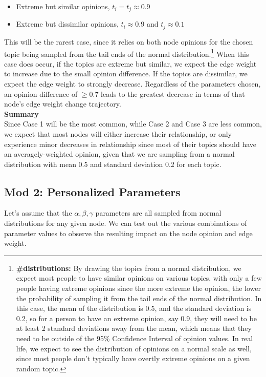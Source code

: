 \documentclass[11pt]{article}
\providecommand{\tightlist}{%
      \setlength{\itemsep}{0pt}\setlength{\parskip}{0pt}}
\begin{document}
\begin{itemize}
\tightlist
\item
  Extreme but similar opinions, \(t_{i} = t_{j} \approx 0.9\)
\item
  Extreme but dissimilar opinions, \(t_{i} \approx 0.9\) and
  \(t_{j} \approx 0.1\)
\end{itemize}

This will be the rarest case, since it relies on both node opinions for
the chosen topic being sampled from the tail ends of the normal
distribution.\footnote{\textbf{\#distributions:} By drawing the topics from a normal distribution, we expect most people to have similar opinions on various topics, with only a few people having extreme opinions since the more extreme the opinion, the lower the probability of sampling it from the tail ends of the normal distribution. In this case, the mean of the distribution is 0.5, and the standard deviation is 0.2, so for a person to have an extreme opinion, say 0.9, they will need to be at least 2 standard deviations away from the mean, which means that they need to be outside of the 95\% Confidence Interval of opinion values. In real life, we expect to see the distribution of opinions on a normal scale as well, since most people don't typically have overtly extreme opinions on a given random topic.} When this case does occur, if the topics are extreme but
similar, we expect the edge weight to increase due to the small opinion
difference. If the topics are dissimilar, we expect the edge weight to
strongly decrease. Regardless of the parameters chosen, an opinion
difference of \(\geq 0.7\) leads to the greatest decrease in terms of
that node's edge weight change trajectory.\\

\textbf{Summary}\\

Since Case 1 will be the most common, while Case 2 and Case 3 are less
common, we expect that most nodes will either increase their
relationship, or only experience minor decreases in relationship since
most of their topics should have an averagely-weighted opinion, given
that we are sampling from a normal distribution with mean 0.5 and
standard deviation 0.2 for each topic.

    \subsection{Mod 2: Personalized Parameters}

Let's assume that the \(\alpha, \beta,\gamma\) parameters are all
sampled from normal distributions for any given node. We can test out
the various combinations of parameter values to observe the resulting
impact on the node opinion and edge weight.
\end{document}
